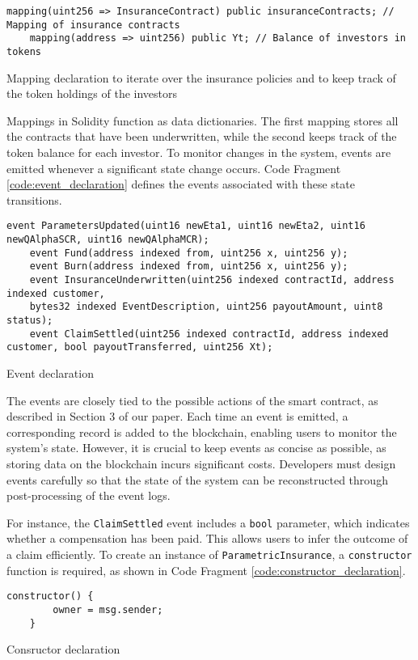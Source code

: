 \documentclass[10pt]{article}
\begin{document}
\begin{codefragment}[!h]
\begin{lstlisting}[language=Solidity]
    mapping(uint256 => InsuranceContract) public insuranceContracts; // Mapping of insurance contracts
    mapping(address => uint256) public Yt; // Balance of investors in tokens
\end{lstlisting}
    \caption{Mapping declaration to iterate over the insurance policies and to keep track of the token holdings of the investors}
    \label{code:mapping_declaration}
\end{codefragment}
Mappings in Solidity function as data dictionaries. The first mapping stores all the contracts that have been underwritten, while the second keeps track of the token balance for each investor. To monitor changes in the system, events are emitted whenever a significant state change occurs. Code Fragment \ref{code:event_declaration} defines the events associated with these state transitions.
\begin{codefragment}[!h]
\begin{lstlisting}[language=Solidity]
    event ParametersUpdated(uint16 newEta1, uint16 newEta2, uint16 newQAlphaSCR, uint16 newQAlphaMCR);
    event Fund(address indexed from, uint256 x, uint256 y);
    event Burn(address indexed from, uint256 x, uint256 y);
    event InsuranceUnderwritten(uint256 indexed contractId, address indexed customer, 
    bytes32 indexed EventDescription, uint256 payoutAmount, uint8 status);
    event ClaimSettled(uint256 indexed contractId, address indexed customer, bool payoutTransferred, uint256 Xt);

\end{lstlisting}
    \caption{Event declaration}
    \label{code:event_declaration}
\end{codefragment}
The events are closely tied to the possible actions of the smart contract, as described in Section 3 of our paper. Each time an event is emitted, a corresponding record is added to the blockchain, enabling users to monitor the system's state. However, it is crucial to keep events as concise as possible, as storing data on the blockchain incurs significant costs. Developers must design events carefully so that the state of the system can be reconstructed through post-processing of the event logs.

For instance, the \texttt{ClaimSettled} event includes a \texttt{bool} parameter, which indicates whether a compensation has been paid. This allows users to infer the outcome of a claim efficiently. To create an instance of \texttt{ParametricInsurance}, a \texttt{constructor} function is required, as shown in Code Fragment \ref{code:constructor_declaration}.
\begin{codefragment}[!h]
\begin{lstlisting}[language=Solidity]
    constructor() {
        owner = msg.sender;
    }
\end{lstlisting}
    \caption{Consructor declaration}
    \label{code:constructor_declaration}
\end{codefragment}
\end{document}
